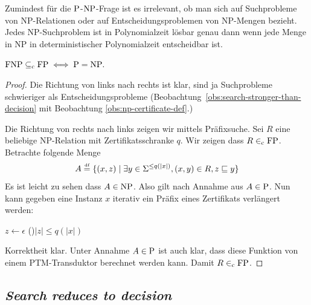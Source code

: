 
Zumindest für die $\P$-$\NP$-Frage ist es irrelevant, ob man sich auf Suchprobleme von NP-Relationen oder auf Entscheidungsproblemen von NP-Mengen bezieht. Jedes NP-Suchproblem ist in Polynomialzeit lösbar genau dann wenn jede Menge in NP in deterministischer Polynomialzeit entscheidbar ist.
\begin{lemma}\label{lemma:equiv-p-np-question}
    $\FNP\subseteqc \FP \iff \P = \NP.$
\end{lemma}
\begin{proof}
    Die Richtung von links nach rechts ist klar, sind ja Suchprobleme schwieriger als Entscheidungsprobleme (Beobachtung~\ref{obs:search-stronger-than-decision} mit Beobachtung \ref{obs:np-certificate-def}.)

    Die Richtung von rechts nach links zeigen wir mittels Präfixsuche. Sei $R$ eine beliebige NP-Relation mit Zertifikatsschranke $q$. Wir zeigen dass $R\inc\FP$.
    Betrachte folgende Menge
    \[ A \defeq \{ (x,z) \mid \exists y\in\Sigma^{\leq q(|x|)}, (x,y)\in R, z\sqsubseteq y \} \]
    Es ist leicht zu sehen dass $A\in\NP$. Also gilt nach Annahme aus $A\in\P$.
    Nun kann gegeben eine Instanz $x$ iterativ ein Präfix eines Zertifikats verlängert werden:\\
    \begin{algorithm}[H]
        $z\gets\epsilon$\;
        \While(){$|z|\leq q(|x|)$}
        {
            \Else{\Reject}
        }
        \Reject
    \end{algorithm}
    \noindent
    Korrektheit klar.
    Unter Annahme $A\in\P$ ist auch klar, dass diese Funktion von einem PTM-Transduktor berechnet werden kann. Damit $R\inc\FP$.
\end{proof}

\subsection*{\emph{Search reduces to decision}}

